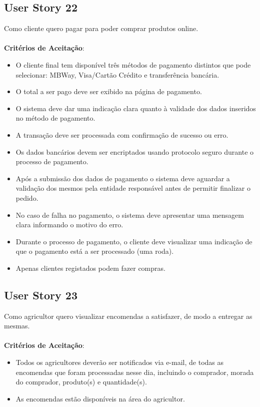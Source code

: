 \documentclass[a4paper,11pt]{article}
\begin{document}
\subsection{User Story 22}
Como cliente quero pagar para poder comprar produtos online.\\\\
\textbf{Critérios de Aceitação}:
\begin{itemize}
  \item O cliente final tem disponível três métodos de pagamento distintos que pode selecionar: MBWay, Visa/Cartão Crédito e transferência bancária.
  \item O total a ser pago deve ser exibido na página de pagamento.
  \item O sistema deve dar uma indicação clara quanto à validade dos dados inseridos no método de pagamento.
  \item A transação deve ser processada com confirmação de sucesso ou erro.
  \item Os dados bancários devem ser encriptados usando protocolo seguro durante o processo de pagamento.
  \item Após a submissão dos dados de pagamento o sistema deve aguardar a validação dos mesmos pela entidade responsável antes de permitir finalizar o pedido.
  \item No caso de falha no pagamento, o sistema deve apresentar uma mensagem clara informando o motivo do erro.
  \item Durante o processo de pagamento, o cliente deve visualizar uma indicação de que o pagamento está a ser processado (uma roda).
  \item Apenas clientes registados podem fazer compras.
\end{itemize}
\subsection{User Story 23}
Como agricultor quero visualizar encomendas a satisfazer, de modo a entregar as mesmas.\\\\
\textbf{Critérios de Aceitação}:
\begin{itemize}
  \item Todos os agricultores deverão ser notificados via e-mail, de todas as encomendas que foram processadas nesse dia, incluindo o comprador, morada do comprador, produto(s) e quantidade(s).
  \item As encomendas estão disponíveis na área do agricultor.
\end{itemize}
\end{document}
